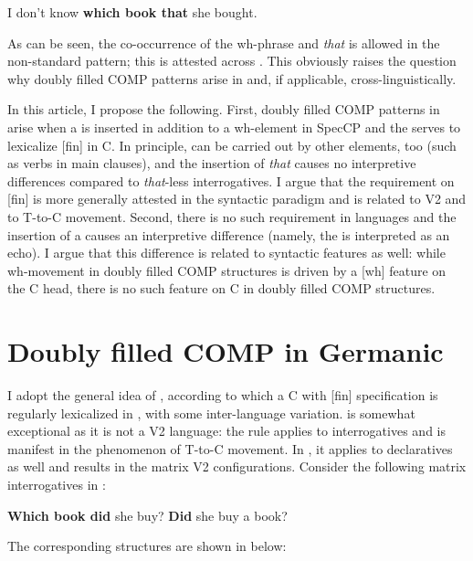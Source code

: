 \documentclass[output=paper,modfonts, hidelinks, newtxmath]{langscibook}
\begin{document}
\ea
	  I don't know \textbf{which book that} she bought. \label{whichbookthat} 
\z
\largerpage

\noindent As can be seen, the co-occurrence of the wh-phrase and \textit{that} is allowed in the non-standard pattern; this is attested across . This obviously raises the question why doubly filled COMP patterns arise in  and, if applicable, cross-linguistically.

In this article, I propose the following. First, doubly filled COMP patterns in  arise when a  is inserted in addition to a wh-element in SpecCP and the  serves to lexicalize [fin] in C. In principle,  can be carried out by other elements, too (such as verbs in main clauses), and the insertion of \textit{that} causes no interpretive differences compared to \textit{that}-less interrogatives. I argue that the  requirement on [fin] is more generally attested in the syntactic paradigm and is related to V2 and to T-to-C movement. Second, there is no such  requirement in  languages and the insertion of a  causes an interpretive difference (namely, the  is interpreted as an echo). I argue that this difference is related to syntactic features as well: while wh-movement in  doubly filled COMP structures is driven by a [wh] feature on the C head, there is no such feature on C in  doubly filled COMP structures.

\section{Doubly filled COMP in Germanic}
\largerpage %
I adopt the general idea of \citet{bacskaiatkaritoappear}, according to which a C with  [fin] specification is regularly lexicalized in , with some inter-language variation.  is somewhat exceptional as it is not a V2 language: the  rule applies to interrogatives and is manifest in the phenomenon of T-to-C movement. In , it applies to declaratives as well and results in the matrix V2 configurations. Consider the following matrix interrogatives in :

\ea
	\ea \textbf{Which book did} she buy? 
	\ex \textbf{Did} she buy a book? 
	\z
\z

\noindent The corresponding structures are shown in  below:
\end{document}
